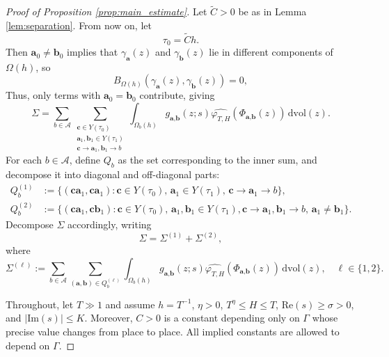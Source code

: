 \documentclass[12pt,letterpaper]{amsart}
\theoremstyle{plain}
\theoremstyle{definition}
\theoremstyle{remark}
\newcommand{\Aa}{\textbf{a}}
\newcommand{\Bb}{\textbf{b}}
\newcommand{\Cc}{\textbf{c}}
\begin{document}
\begin{proof}[Proof of Proposition \ref{prop:main_estimate}]
Let $\widetilde{C} > 0$ be as in Lemma \ref{lem:separation}. From now on, let
$$
\tau_0 = \widetilde{C} h.
$$
Then $\Aa_0 \neq \Bb_0$ implies that $\gamma_\Aa(z)$ and $\gamma_\Bb(z)$ lie in different components of $\Omega(h)$, so
$$
B_{\Omega(h)}(\gamma_\Aa(z), \gamma_\Bb(z)) = 0,
$$
Thus, only terms with $\Aa_0 = \Bb_0$ contribute, giving
\begin{equation}\label{eq:reexpr}
\Sigma =   \sum_{b \in \mathcal{A}} 
\sum_{\substack{
\Cc \in Y(\tau_0)\\
\Aa_1,\Bb_1 \in Y(\tau_1)\\
\Cc \to \Aa_1,\Bb_1 \to b
}}
\int_{\Omega_b(h)} g_{\Aa,\Bb}(z;s) \widehat{\varphi_{T,H}}(\Phi_{\Aa,\Bb}(z)) \,\mathrm{dvol}(z).
\end{equation}
For each $b\in \mathcal{A}$, define $Q_b$ as the set corresponding to the inner sum, and decompose it into diagonal and off-diagonal parts:
\begin{align*}
Q_b^{(1)} &:= \{ (\Cc\Aa_1,\Cc\Aa_1) : \Cc \in Y(\tau_0),\, 
\Aa_1\in Y(\tau_1),\, \Cc \to \Aa_1 \to b   \}, \\
Q_b^{(2)} &:= \{ (\Cc\Aa_1,\Cc\Bb_1) : \Cc \in Y(\tau_0),\, 
\Aa_1, \Bb_1\in Y(\tau_1), \Cc \to \Aa_1, \Bb_1 \to b ,\, \Aa_1 \neq \Bb_1 \}.
\end{align*}
Decompose $\Sigma$ accordingly, writing
$$
\Sigma = \Sigma^{(1)} + \Sigma^{(2)},
$$
where
$$
\Sigma^{(\ell)} := \sum_{b \in \mathcal{A}} 
\sum_{(\Aa,\Bb) \in Q_b^{(\ell)}}
\int_{\Omega_b(h)} g_{\Aa,\Bb}(z;s) \widehat{\varphi_{T,H}}(\Phi_{\Aa,\Bb}(z)) \,\mathrm{dvol}(z), \quad \ell\in \{1,2\}.
$$

Throughout, let $T\gg 1$ and assume $h=T^{-1}$, $\eta > 0$, $T^{\eta}\le H \le  T$, $\mathrm{Re}(s)\ge \sigma>0$, and $\vert \mathrm{Im}(s) \vert\le  K$. Moreover, $C>0$ is a constant depending only on $\Gamma$ whose precise value changes from place to place. All implied constants are allowed to depend on $\Gamma.$


\end{proof}
\end{document}
